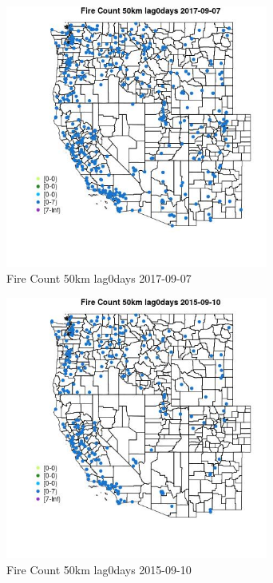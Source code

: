 \begin{figure} 
\centering  
\includegraphics[width=0.77\textwidth]{Code_Outputs/Report_ML_input_PM25_Step4_part_e_de_duplicated_aves_compiled_2019-05-20wNAs_MapObsFire_Count_50km_lag0days2017-09-07.jpg} 
\caption{\label{fig:Report_ML_input_PM25_Step4_part_e_de_duplicated_aves_compiled_2019-05-20wNAsMapObsFire_Count_50km_lag0days2017-09-07}Fire Count 50km lag0days 2017-09-07} 
\end{figure} 
 

\begin{figure} 
\centering  
\includegraphics[width=0.77\textwidth]{Code_Outputs/Report_ML_input_PM25_Step4_part_e_de_duplicated_aves_compiled_2019-05-20wNAs_MapObsFire_Count_50km_lag0days2015-09-10.jpg} 
\caption{\label{fig:Report_ML_input_PM25_Step4_part_e_de_duplicated_aves_compiled_2019-05-20wNAsMapObsFire_Count_50km_lag0days2015-09-10}Fire Count 50km lag0days 2015-09-10} 
\end{figure} 
 

